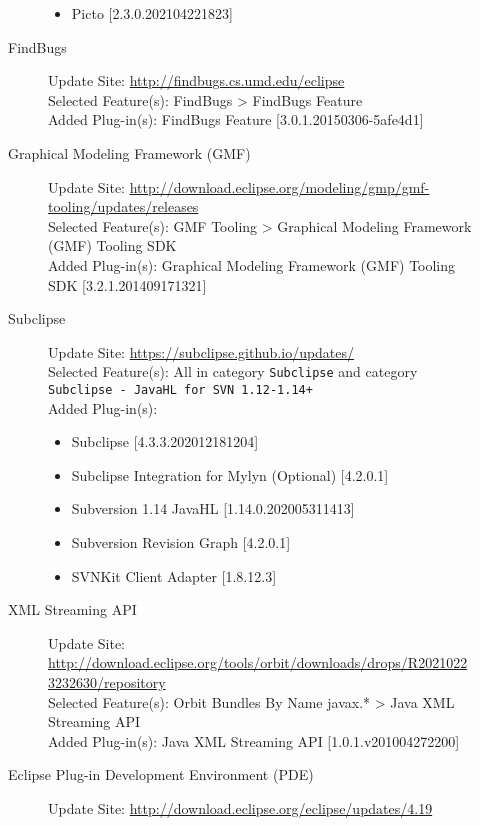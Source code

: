 \begin{description}
\begin{description}
\begin{itemize}
				\item Picto [2.3.0.202104221823]
			\end{itemize}
			\item[FindBugs] $ $\\
			Update Site: \url{http://findbugs.cs.umd.edu/eclipse} \\
			Selected Feature(s): FindBugs > FindBugs Feature \\
			Added Plug-in(s): FindBugs Feature [3.0.1.20150306-5afe4d1]
			\item[Graphical Modeling Framework (GMF)] $ $\\
			Update Site: \url{http://download.eclipse.org/modeling/gmp/gmf-tooling/updates/releases} \\
			Selected Feature(s): GMF Tooling > Graphical Modeling Framework (GMF) Tooling SDK \\
			Added Plug-in(s): Graphical Modeling Framework (GMF) Tooling SDK [3.2.1.201409171321]
			\item[Subclipse] $ $\\
			Update Site: \url{https://subclipse.github.io/updates/} \\
			Selected Feature(s): All in category \texttt{Subclipse} and category \texttt{Subclipse - JavaHL for SVN 1.12-1.14+} \\
			Added Plug-in(s):
			\begin{itemize}
				\item Subclipse [4.3.3.202012181204]
				\item Subclipse Integration for Mylyn (Optional) [4.2.0.1]
				\item Subversion 1.14 JavaHL [1.14.0.202005311413]
				\item Subversion Revision Graph [4.2.0.1]
				\item SVNKit Client Adapter [1.8.12.3]
			\end{itemize}
			\item[XML Streaming API] $ $\\
			Update Site: \url{http://download.eclipse.org/tools/orbit/downloads/drops/R20210223232630/repository} \\
			Selected Feature(s): Orbit Bundles By Name javax.* > Java XML Streaming API \\
			Added Plug-in(s): Java XML Streaming API [1.0.1.v201004272200]
			\item[Eclipse Plug-in Development Environment (PDE)] $ $\\
			Update Site: \url{http://download.eclipse.org/eclipse/updates/4.19} \\

\end{description}
\end{description}
